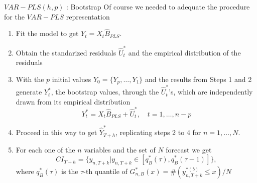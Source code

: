\documentclass{beamer}
\newcommand{\?}{?`}
\begin{document}
\begin{frame}{$VAR-PLS(h,p)$ : Bootstrap}
  Of course we needed to adequate the procedure for the $VAR-PLS$ representation
  \begin{footnotesize}
  \begin{enumerate}
  \item Fit the model  to get   $Y_t=X_t\hat{B}_{PLS}$.
  \item Obtain the standarized residuals   $\hat{U}_t^{*}$
    and the empirical distribution of the residuals
  \item With the $p$ initial values  $Y_0=\lbrace Y_p,\ldots,Y_1\rbrace$
  and the results from Steps 1 and 2 generate $Y_t^{*}$, the bootstrap values,
  through  the  $\hat{U}_t^{*}$'s, which are independently drawn from its empirical distribution
    \begin{displaymath}
      Y_t^{*}=X_t\hat{B}_{PLS}+\hat{U}_t^{*}, \quad t=1,\ldots,n-p
    \end{displaymath}
  \item Proceed in this way to get   $\hat{Y}_{T+h}^{*}$,
    replicating steps 2 to 4 for   $n=1,\ldots,N$.
  \item For each one of the $n$ variables and the set of $N$ forecast we get
    \begin{displaymath}
      CI_{T+h}=\lbrace y_{n,T+k}|y_{n,T+k} \in
      [q_B^{*}(\tau),q_B^{*}(\tau-1)] \rbrace,
    \end{displaymath}
   where $q_B^{*}(\tau)$ is the $\tau$-th quantile of
    $G_{n,B}^{*}(x)=\#\left(y_{n,T+k}^{*(b)}\leq x\right)/N$
  \end{enumerate}
  \end{footnotesize}
\end{frame}
\end{document}

